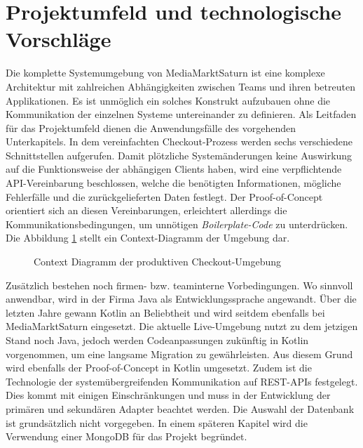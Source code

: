 \pagebreak

\section{Projektumfeld und technologische Vorschläge}

Die komplette Systemumgebung von MediaMarktSaturn ist eine komplexe Architektur mit zahlreichen Abhängigkeiten zwischen Teams und ihren betreuten Applikationen. Es ist unmöglich ein solches Konstrukt aufzubauen ohne die Kommunikation der einzelnen Systeme untereinander zu definieren. Als Leitfaden für das Projektumfeld dienen die Anwendungsfälle des vorgehenden Unterkapitels. In dem vereinfachten Checkout-Prozess werden sechs verschiedene Schnittstellen aufgerufen. Damit plötzliche Systemänderungen keine Auswirkung auf die Funktionsweise der abhängigen Clients haben, wird eine verpflichtende API-Vereinbarung beschlossen, welche die benötigten Informationen, mögliche Fehlerfälle und die zurückgelieferten Daten festlegt. Der Proof-of-Concept orientiert sich an diesen Vereinbarungen, erleichtert allerdings die Kommunikationsbedingungen, um unnötigen \emph{\Gls{Boilerplate-Code}} zu unterdrücken. Die Abbildung \ref{fig:ContextDiagramm} stellt ein Context-Diagramm der Umgebung dar. 

\begin{figure}[htbp]
	\vspace{0.5cm}
	\centering
	
	\caption{Context Diagramm der produktiven Checkout-Umgebung}
	\label{fig:ContextDiagramm}
	\vspace{0.5cm}
\end{figure}

Zusätzlich bestehen noch firmen- bzw. teaminterne Vorbedingungen. Wo sinnvoll anwendbar, wird in der Firma Java als Entwicklungssprache angewandt. Über die letzten Jahre gewann Kotlin an Beliebtheit und wird seitdem ebenfalls bei MediaMarktSaturn eingesetzt. Die aktuelle Live-Umgebung nutzt zu dem jetzigen Stand noch Java, jedoch werden Codeanpassungen zukünftig in Kotlin vorgenommen, um eine langsame Migration zu gewährleisten. Aus diesem Grund wird ebenfalls der Proof-of-Concept in Kotlin umgesetzt. Zudem ist die Technologie der systemübergreifenden Kommunikation auf REST-APIs festgelegt. Dies kommt mit einigen Einschränkungen und muss in der Entwicklung der primären und sekundären Adapter beachtet werden. Die Auswahl der Datenbank ist grundsätzlich nicht vorgegeben. In einem späteren Kapitel wird die Verwendung einer MongoDB für das Projekt begründet.
